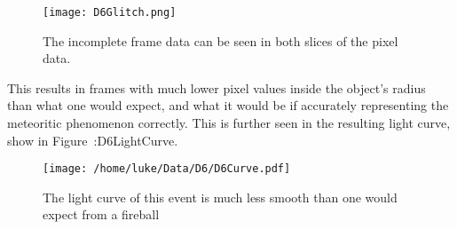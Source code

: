 \begin{figure}[ht!]
	\centering
	\texttt{[image: D6Glitch.png]}
	\caption{The incomplete frame data can be seen in both slices of the pixel data.}
	\label{fig:D6Glitch}
\end{figure}

This results in frames with much lower pixel values inside the object's radius than what one would expect, and what it would be if accurately representing the meteoritic phenomenon correctly. This is further seen in the resulting light curve, show in Figure~:{D6LightCurve}.

\begin{figure}[ht!]
	\centering
	\texttt{[image: /home/luke/Data/D6/D6Curve.pdf]}
	\caption{The light curve of this event is much less smooth than one would expect from a fireball}
	\label{fig:D6LightCurve}
\end{figure}


